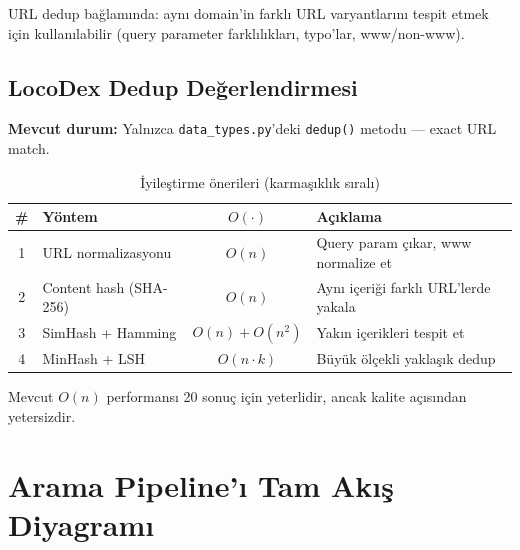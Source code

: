 \noindent
URL dedup ba\u{g}lam{\i}nda: ayn{\i} domain'in farkl{\i} URL varyantlar{\i}n{\i} tespit etmek i\c{c}in kullan{\i}labilir (query parameter farkl{\i}l{\i}klar{\i}, typo'lar, www/non-www).


\subsection{LocoDex Dedup De\u{g}erlendirmesi}
\label{subsec:dedup-assessment}

\textbf{Mevcut durum:} Yaln{\i}zca \texttt{data\_types.py}'deki \texttt{dedup()} metodu --- exact URL match.

\begin{table}[H]
\centering
\caption{\.{I}yile\c{s}tirme \"{o}nerileri (karma\c{s}{\i}kl{\i}k s{\i}ral{\i})}
\label{tab:dedup-improvements}
\begin{tabularx}{\textwidth}{clcX}
\toprule
\color{chapterBlue}\textbf{\#} &
\color{chapterBlue}\textbf{Y\"{o}ntem} &
\color{chapterBlue}\textbf{$O(\cdot)$} &
\color{chapterBlue}\textbf{A\c{c}{\i}klama} \\
\midrule
1 & URL normalizasyonu & $O(n)$ & Query param \c{c}{\i}kar, www normalize et \\
2 & Content hash (SHA-256) & $O(n)$ & Ayn{\i} i\c{c}eri\u{g}i farkl{\i} URL'lerde yakala \\
3 & SimHash + Hamming & $O(n) + O(n^2)$ & Yak{\i}n i\c{c}erikleri tespit et \\
4 & MinHash + LSH & $O(n \cdot k)$ & B\"{u}y\"{u}k \"{o}l\c{c}ekli yakla\c{s}{\i}k dedup \\
\bottomrule
\end{tabularx}
\smallskip
{\small Mevcut $O(n)$ performans{\i} 20 sonu\c{c} i\c{c}in yeterlidir, ancak kalite a\c{c}{\i}s{\i}ndan yetersizdir.}
\end{table}


\section{Arama Pipeline'{\i} Tam Ak{\i}\c{s} Diyagram{\i}}
\label{sec:pipeline-diagram}

